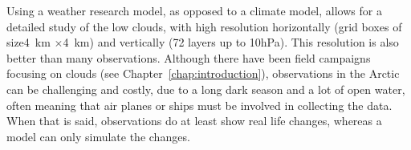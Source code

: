 Using a weather research model, as opposed to a climate model, allows for a detailed study of the low clouds, with high resolution horizontally (grid boxes of size4~km $\times$4~km) and vertically (72 layers up to 10hPa). This resolution is also better than many observations. Although there have been field campaigns focusing on clouds (see Chapter~\ref{chap:introduction}), observations in the Arctic can be challenging and costly, due to a long dark season and a lot of open water, often meaning that air planes or ships must be involved in collecting the data. When that is said, observations do at least show real life changes, whereas a model can only simulate the changes.